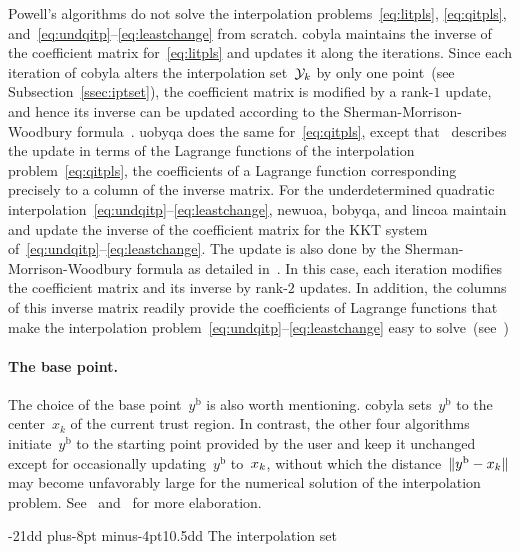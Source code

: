 \documentclass[
    smallextended,  %
    draft,          %
    final,          %
]{svjour3}
\makeatletter
\newcommand{\base}{{\text{b}}}
\newcommand{\iter}[1][k]{x\ifthenelse{\equal{#1}{}}{}{_{#1}}}
\newcommand{\norm}[2][]{#1\lVert#2#1\rVert}
\newcommand{\xpt}[1][k]{\mathcal{Y}\ifthenelse{\equal{#1}{}}{}{_{#1}}}
\def\subsubsection{\@startsection{subsubsection}{2}{\z@}%
    {-21dd plus-8pt minus-4pt}{10.5dd}
     {\normalsize\bfseries}}
\makeatother
\begin{document}
Powell's algorithms do not solve the interpolation problems~\eqref{eq:litpls}, \eqref{eq:qitpls},
and~\mbox{\eqref{eq:undqitp}--\eqref{eq:leastchange}} from scratch.
\gls{cobyla} maintains the inverse of the coefficient matrix for~\eqref{eq:litpls}
and updates it along the iterations.
Since each iteration of \gls{cobyla} alters the interpolation set~$\xpt$ by only one
point~(see Subsection~\ref{ssec:iptset}), the coefficient matrix is modified by a rank-$1$ update, and hence
its inverse can be updated according to the Sherman-Morrison-Woodbury formula~\cite{Hager_1989}.
\gls{uobyqa} does the same for~\eqref{eq:qitpls},
except that~\cite[\S~4]{Powell_2002} describes the update in terms of the Lagrange functions of the
interpolation problem~\eqref{eq:qitpls}, the coefficients of a Lagrange function corresponding
precisely to a column of the inverse matrix.
For the underdetermined quadratic interpolation~\mbox{\eqref{eq:undqitp}--\eqref{eq:leastchange}},
\gls{newuoa}, \gls{bobyqa}, and \gls{lincoa}
maintain and update the inverse of the coefficient matrix for the KKT system
of~\mbox{\eqref{eq:undqitp}--\eqref{eq:leastchange}}.
The update is also done by the
Sherman-Morrison-Woodbury formula as detailed in~\cite[\S~2]{Powell_2004c}.
In this case, each
iteration modifies the coefficient matrix and its inverse by rank-$2$ updates.
In addition, the columns of this inverse matrix readily provide the coefficients of Lagrange
functions that make the interpolation problem~\mbox{\eqref{eq:undqitp}--\eqref{eq:leastchange}}
easy to solve~(see~\mbox{\cite[\S~3]{Powell_2004b}})


\paragraph{\textnormal{\textbf{The base point.}}}

The choice of the base point~$y^{\base}$ is also worth mentioning.
\Gls{cobyla} sets~$y^{\base}$ to the center~$x_k$ of the current trust region.
In contrast, the other four algorithms initiate~$y^{\base}$ to the starting point provided by the
user and keep it unchanged except for occasionally updating~$y^{\base}$ to~$\iter$, without which
the distance~$\norm{y^{\base}-\iter}$ may become unfavorably large for the numerical solution of the
interpolation problem.
See~\cite[\S~5]{Powell_2004b} and~\cite[\S~7]{Powell_2006} for more elaboration.

\subsubsection{The interpolation set}
\label{ssec:iptset}
\end{document}
